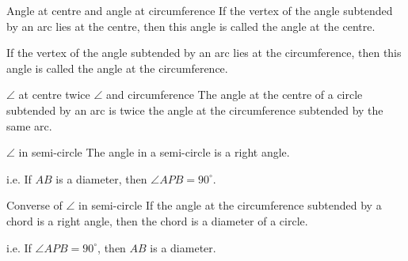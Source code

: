 
\begin{mysubsection}{}
    \begin{definition}[def:]{Angle at centre and angle at circumference}
        If the vertex of the angle subtended by an arc lies at the centre, then this angle is called the angle at the centre.

        If the vertex of the angle subtended by an arc lies at the circumference, then this angle is called the angle at the circumference.
    \end{definition}

    \begin{theorem}[thm:]{$\angle $ at centre twice $\angle $ and circumference}
        The angle at the centre of a circle subtended by an arc is twice the angle at the circumference subtended by the same arc.
        \begin{figure}[H]
            \centering
            \quad
            \quad
        \end{figure}
    \end{theorem}

    \begin{theorem}[thm:]{$\angle $ in semi-circle}
        The angle in a semi-circle is a right angle.

        i.e. If $AB$ is a diameter, then $\angle APB=90^{\circ}$.
    \end{theorem}
    \vspace{2em}

    \begin{theorem}[thm:]{Converse of $\angle $ in semi-circle}
        If the angle at the circumference subtended by a chord is a right angle, then the chord is a diameter of a circle.

        i.e. If $\angle APB=90^{\circ} $, then  $AB$ is a diameter.
    \end{theorem}
\end{mysubsection}

